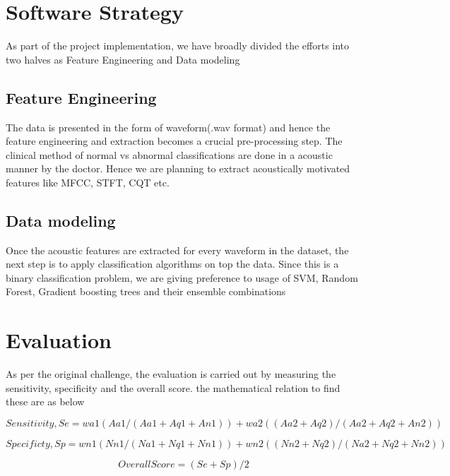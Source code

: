 \documentclass[12pt]{article}
\begin{document}
\section{Software Strategy}
As part of the project implementation, we have broadly divided the efforts into two halves as Feature Engineering and Data modeling

\subsection{Feature Engineering}
The data is presented in the form of waveform(.wav format) and hence the feature engineering and extraction becomes a crucial pre-processing step. The clinical method of normal vs abnormal classifications are done in a acoustic manner by the doctor. Hence we are planning to extract acoustically motivated features like MFCC, STFT, CQT etc.

\subsection{Data modeling}
Once the acoustic features are extracted for every waveform in the dataset, the next step is to apply classification algorithms on top the data. Since this is a binary classification problem, we are giving preference to usage of SVM, Random Forest, Gradient boosting trees and their ensemble combinations

\section{Evaluation}
As per the original challenge, the evaluation is carried out by measuring the sensitivity, specificity and the overall score. the mathematical relation to find these are as below

\begin{equation}
Sensitivity, Se = wa1(Aa1/(Aa1 + Aq1 + An1)) + wa2((Aa2 + Aq2)/(Aa2 + Aq2 + An2))
\end{equation}

\begin{equation}
Specificty, Sp = wn1(Nn1/(Na1 + Nq1 + Nn1)) + wn2((Nn2 + Nq2)/(Na2 + Nq2 + Nn2))
\end{equation}

\begin{equation}
Overall Score = (Se + Sp) / 2
\end{equation}\\
\end{document}
